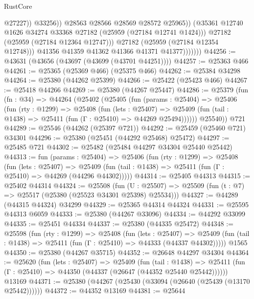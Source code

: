 \begin{lexlean}{RustCore}
\begin{coremodule}
                                  @27227))
                              @33256))
                          @28563
                          @28566
                          @28569
                          @28572
                          @25965))
                      (@35361 @12740 @1626 @34274 @33368 @27182 (@25959 (@27184 @12741 @1424)))
                      @27182
                      (@25959 (@27184 @12364 @12747)))
                    @27182
                    (@25959 (@27184 @12354 @12748)))
                  @41356
                  @41359
                  @41362
                  @41366
                  @41371
                  @41377)))))))
@44256 := @43631 (@43656 (@43697 (@43699 (@43701 @44251))))
@44257 := @25363 @466
@44261 := @25365 (@25369 @466) (@25375 @466)
@44262 := @25384 @34298
@44264 := @25380 (@44262 @25399)
@44266 := @25422 (@25423 @466)
@44267 := @25418 @44266
@44269 := @25380 (@44267 @25447)
@44286 := @25379
    (fun (fn : @34) =>
    @44264
      (@25402
        (@25405
          (fun (params : @25404) =>
          @25406
            (fun (rty : @1299) =>
            @25408
              (fun (lets : @25407) =>
              @25409 (fun (tail : @1438) => @25411 (fun (Γ : @25410) => @44269 @25494))))))
        @25540))
    @721
@44289 := @25546 (@44262 (@25397 @721))
@44292 := @25459 (@25460 @721) @34301
@44296 := @25380 (@25451 (@44292 @25468) @25472)
@44297 := @25485 @721
@44302 := @25482 (@25484 @44297 @34304 @25440 @25442)
@44313 := fun (params : @25404) =>
  @25406
    (fun (rty : @1299) =>
    @25408
      (fun (lets : @25407) =>
      @25409 (fun (tail : @1438) => @25411 (fun (Γ : @25410) => @44269 (@44296 @44302)))))
@44314 := @25405 @44313
@44315 := @25402 @44314
@44324 := @25508
    (fun (U : @25507) => @25509 (fun (t : @7) => @25517 (@25380 (@25523 @34301 @25398) @25534)))
@44327 := @44289 (@44315 @44324) @34299
@44329 := @25365 @44314 @44324
@44331 := @25595 @44313 @6059
@44333 := @25380 (@44267 @33096)
@44334 := @44292 @33099
@44335 := @25451 @44334
@44337 := @25380 (@44335 @25472)
@44348 := @25598
    (fun (rty : @1299) =>
    @25408
      (fun (lets : @25407) =>
      @25409 (fun (tail : @1438) => @25411 (fun (Γ : @25410) => @44333 (@44337 @44302)))))
    @1565
@44350 := @25380 (@44267 @35715)
@44352 := @26648 @44297 @34304
@44364 := @25620
    (fun (lets : @25407) =>
    @25409
      (fun (tail : @1438) =>
      @25411 (fun (Γ : @25410) => @44350 (@44337 (@26647 (@44352 @25440 @25442))))))
    @13169
@44371 := @25380 (@44267 (@25430 (@33094 (@26640 (@25439 (@13170 @25442))))))
@44372 := @44352 @13169
@44381 := @25644

\end{coremodule}
\end{lexlean}
